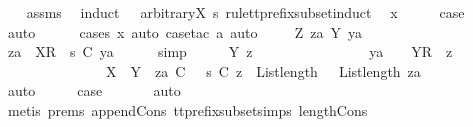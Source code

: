 \begin{isabellebody}
%
\isadelimproof
\ \ %
\endisadelimproof
%
\isatagproof
{}\isamarkupfalse%
\ assms\ \isamarkupfalse%
\ {\isacharparenleft}induct\ {\isasymrho}\ {\isasymsigma}\ arbitrary{\isacharcolon}X\ s\ rule{\isacharcolon}tt{\isacharunderscore}prefix{\isacharunderscore}subset{\isachardot}induct{\isacharparenright}\isanewline
{}\isamarkupfalse%
\ {\isacharparenleft}{}\ x{\isacharparenright}\isanewline
\ \ \isamarkupfalse%
\ \isamarkupfalse%
\ {\isacharquery}case\ \isanewline
\ \ \ \ \isamarkupfalse%
\ auto\isanewline
\ \ \ \ \isamarkupfalse%
\ {\isacharparenleft}cases\ x{\isacharcomma}\ auto{\isacharcomma}\ case{\isacharunderscore}tac\ a{\isacharcomma}\ auto{\isacharparenright}\isanewline
{}\isamarkupfalse%
\isanewline
\ \ \isamarkupfalse%
\ {\isacharparenleft}{}\ Z\ za\ Y\ ya{\isacharparenright}\isanewline
\ \ \isamarkupfalse%
\ \isamarkupfalse%
\ {\isachardoublequoteopen}za\ {\isacharat}\ {\isacharbrackleft}{\isacharbrackleft}X{\isacharbrackright}\isactrlsub R{\isacharbrackright}\ {\isacharat}\ s\ {\isasymlesssim}\isactrlsub C\ ya{\isachardoublequoteclose}\isanewline
\ \ \ \ \isamarkupfalse%
\ simp\isanewline
\ \ \isamarkupfalse%
\ \isamarkupfalse%
\ {\isachardoublequoteopen}{\isasymexists}Y\ z\ {\isasymrho}\isanewline
\ \ \ \ \ \ \ \ \ \ \ \ \ \ \ ya\ {\isacharequal}\ {\isasymrho}\ {\isacharat}\ {\isacharbrackleft}Y{\isacharbrackright}\isactrlsub R\ {\isacharhash}\ z\ {\isasymand}\isanewline
\ \ \ \ \ \ \ \ \ \ \ \ \ \ \ X\ {\isasymsubseteq}\ Y\ {\isasymand}\ za\ {\isasymlesssim}\isactrlsub C\ {\isasymrho}\ {\isasymand}\ s\ {\isasymlesssim}\isactrlsub C\ z\ {\isasymand}\ List{\isachardot}length\ {\isasymrho}\ {\isacharequal}\ List{\isachardot}length\ za{\isachardoublequoteclose}\isanewline
\ \ \ \ \isamarkupfalse%
\ {}\ \isamarkupfalse%
\ auto\isanewline
\ \ \isamarkupfalse%
\ \isamarkupfalse%
\ {\isacharquery}case\ \isanewline
\ \ \ \ \isamarkupfalse%
\ auto\isanewline
\ \ \ \ \isamarkupfalse%
\ {\isacharparenleft}metis\ {\isachardoublequoteopen}{}{\isachardot}prems{\isachardoublequoteclose}\ append{\isacharunderscore}Cons\ tt{\isacharunderscore}prefix{\isacharunderscore}subset{\isachardot}simps{\isacharparenleft}{}{\isacharparenright}\ length{\isacharunderscore}Cons{\isacharparenright}\isanewline

\end{isabellebody}
